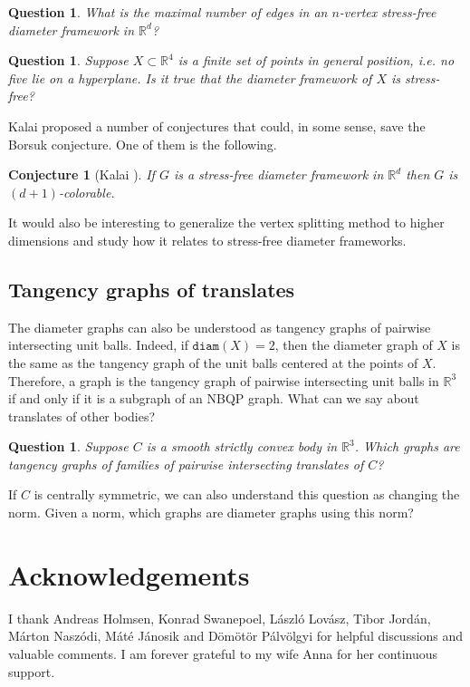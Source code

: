 \documentclass[10pt,a4paper]{article}
\newtheorem{conjecture}[theorem]{Conjecture}
\newtheorem{question}[theorem]{Question}
\newcommand{\R}[0]{\mathbb{R}}
\newcommand{\diam}[0]{\mathtt{diam}}
\begin{document}
\begin{question}
    What is the maximal number of edges in an $n$-vertex stress-free diameter framework in $\R^d$?
\end{question}
\begin{question}
    Suppose $X\subset \R^4$ is a finite set of points in general position, i.e. no five lie on a hyperplane. Is it true that the diameter framework of $X$ is stress-free?
\end{question}

Kalai proposed a number of conjectures that could, in some sense, save the Borsuk conjecture. One of them is the following. 
\begin{conjecture}[Kalai \cite{Kalai_2015}]
    If $G$ is a stress-free diameter framework in $\R^d$  then $G$ is $(d+1)$-colorable.
\end{conjecture}



It would also be interesting to generalize the vertex splitting method to higher dimensions and study how it relates to stress-free diameter frameworks.


\subsection{Tangency graphs of translates}
The diameter graphs can also be understood as tangency graphs of pairwise intersecting unit balls. Indeed, if $\diam (X)=2$, then the diameter graph of $X$ is the same as the tangency graph of the unit balls centered at the points of $X$. Therefore, a graph is the tangency graph of pairwise intersecting unit balls in $\R^3$ if and only if it is a subgraph of an NBQP graph. What can we say about translates of other bodies? 
\begin{question}
Suppose $C$ is a smooth strictly convex body in $\R^3$. Which graphs are tangency graphs of families of pairwise intersecting translates of $C$?
\end{question}

If $C$ is centrally symmetric, we can also understand this question as changing the norm. Given a norm, which graphs are diameter graphs using this norm?



\section*{Acknowledgements}
I thank Andreas Holmsen, Konrad Swanepoel, László Lovász, Tibor Jordán, Márton Naszódi, Máté Jánosik and Dömötör Pálvölgyi for helpful discussions and valuable comments. I am forever grateful to my wife Anna for her continuous support. 
\end{document}
